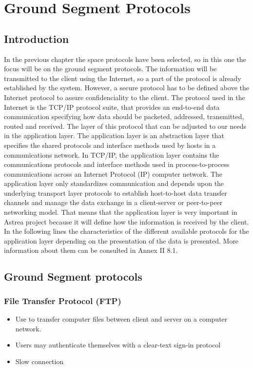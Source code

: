 \chapter{Ground Segment Protocols}

\section{Introduction}
In the previous chapter the space protocols have been selected, so in this one the focus will be on the ground segment protocols. The information will be transmitted to the client using the Internet, so a part of the protocol is already established by the system. However, a secure protocol has to be defined above the Internet protocol to assure confidenciality to the client. The protocol used in the Internet is the TCP/IP protocol suite, that provides an end-to-end data communication specifying how data should be packeted, addressed, transmitted, routed and received. The layer of this protocol that can be adjusted to our needs in the application layer. The application layer is an abstraction layer that specifies the shared protocols and interface methods used by hosts in a communications network. In TCP/IP, the application layer contains the communications protocols and interface methods used in process-to-process communications across an Internet Protocol (IP) computer network. The application layer only standardizes communication and depends upon the underlying transport layer protocols to establish host-to-host data transfer channels and manage the data exchange in a client-server or peer-to-peer networking model. That means that the application layer is very important in Astrea project because it will define how the information is received by the client.\\
In the following lines the characteristics of the different available protocols for the application layer depending on the presentation of the data is presented. More information about them can be consulted in Annex II 8.1.
\section{Ground Segment protocols}

\subsection{File Transfer Protocol (FTP)}
\begin{itemize}
\item Use to transfer computer files between client and server on a computer network.
\item Users may authenticate themselves with a clear-text sign-in protocol
\item Slow connection 
\end{itemize}

